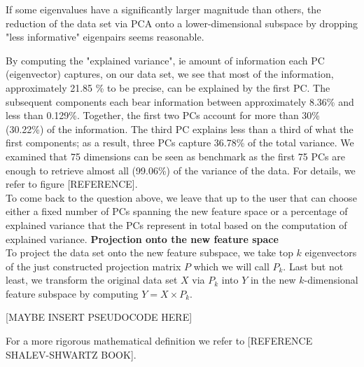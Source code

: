 \documentclass[journal, a4paper]{IEEEtran}
\begin{document}
If some eigenvalues have a significantly larger magnitude than others, the reduction of the data set via PCA onto a lower-dimensional subspace by dropping "less informative" eigenpairs seems reasonable.

By computing the "explained variance", ie amount of information each PC (eigenvector) captures, on our data set, we see that most of the information, approximately 21.85 \% to be precise, can be explained by the first PC. The subsequent components each bear information between approximately 8.36\% and less than 0.129\%. Together, the first two PCs account for more than 30\% (30.22\%) of the information. The third PC explains less than a third of what the first components; as a result, three PCs capture 36.78\% of the total variance. We examined that 75 dimensions can be seen as benchmark as the first 75 PCs are enough to retrieve almost all (99.06\%) of the variance of the data. For details, we refer to figure [REFERENCE]. \\


To come back to the question above, we leave that up to the user that can choose either a fixed number of PCs spanning the new feature space or a percentage of explained variance that the PCs represent in total based on the computation of explained variance.
\newline
%
\textbf{Projection onto the new feature space}\\
To project the data set onto the new feature subspace, we take top \( k \) eigenvectors of the just constructed projection matrix \( P \) which we will call \( P_{k} \).
Last but not least, we transform the original data set \( X \) via \( P_{k} \) into \( Y \) in the new \(k\)-dimensional feature subspace by computing \( Y = X \times P_{k} \).

[MAYBE INSERT PSEUDOCODE HERE]

For a more rigorous mathematical definition we refer to [REFERENCE SHALEV-SHWARTZ BOOK].



\end{document}
